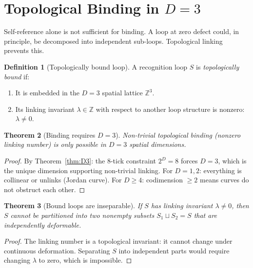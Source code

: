 \documentclass[11pt,a4paper]{article}
\theoremstyle{plain}
\newtheorem{theorem}{Theorem}[section]
\theoremstyle{definition}
\newtheorem{definition}[theorem]{Definition}
\theoremstyle{remark}
\newcommand{\Z}{\mathbb{Z}}
\begin{document}
\section{Topological Binding in $D = 3$}
\label{sec:topo}

Self-reference alone is not sufficient for binding.  A loop at zero
defect could, in principle, be decomposed into independent sub-loops.
Topological linking prevents this.

\begin{definition}[Topologically bound loop]
\label{def:topo-bound}
A recognition loop $S$ is \emph{topologically bound} if:
\begin{enumerate}[nosep,label=(\roman*)]
\item It is embedded in the $D = 3$ spatial lattice $\Z^3$.
\item Its linking invariant $\lambda \in \Z$ with respect to another
  loop structure is nonzero: $\lambda \neq 0$.
\end{enumerate}
\end{definition}

\begin{theorem}[Binding requires $D = 3$]
\label{thm:binding-D3}
Non-trivial topological binding (nonzero linking number) is only
possible in $D = 3$ spatial dimensions.
\end{theorem}

\begin{proof}
By Theorem~\ref{thm:D3}: the 8-tick constraint $2^D = 8$ forces
$D = 3$, which is the unique dimension supporting non-trivial linking.
For $D = 1, 2$: everything is collinear or unlinks (Jordan curve).
For $D \geq 4$: codimension $\geq 2$ means curves do not obstruct each
other.
\end{proof}

\begin{theorem}[Bound loops are inseparable]
\label{thm:inseparable}
If $S$ has linking invariant $\lambda \neq 0$, then $S$ cannot be
partitioned into two nonempty subsets $S_1 \sqcup S_2 = S$ that are
independently deformable.
\end{theorem}

\begin{proof}
The linking number is a topological invariant: it cannot change under
continuous deformation.  Separating $S$ into independent parts would
require changing $\lambda$ to zero, which is impossible.
\end{proof}
\end{document}
